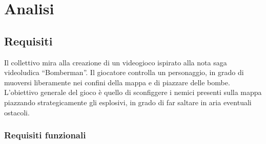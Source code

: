 \documentclass[a4paper,12pt]{report}
\begin{document}
\tableofcontents

\chapter{Analisi}
\section{Requisiti}
Il collettivo mira alla creazione di un videogioco ispirato alla nota saga videoludica “Bomberman”.
Il giocatore controlla un personaggio, in grado di muoversi liberamente nei confini della mappa e di piazzare delle bombe. L’obiettivo generale del gioco è quello di sconfiggere i nemici presenti sulla mappa piazzando strategicamente gli esplosivi, in grado di far saltare in aria eventuali ostacoli.

\subsection*{Requisiti funzionali}
\end{document}
